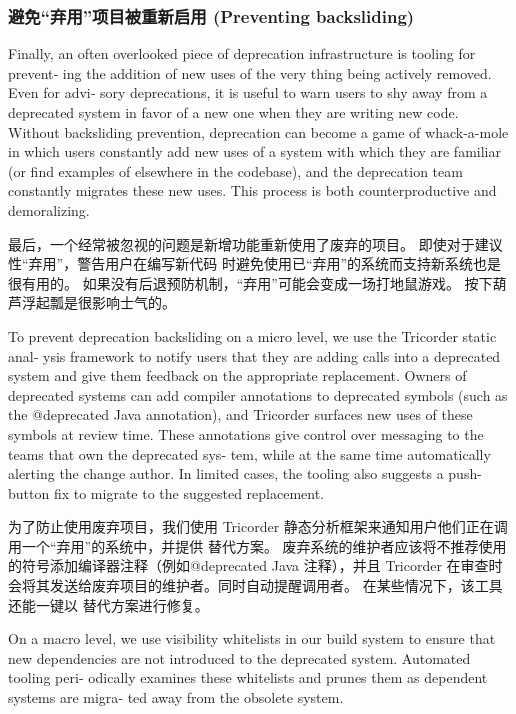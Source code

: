 \documentclass[10pt,a4paper,UTF8]{ctexart}
\begin{document}
\subsubsection{避免“弃用”项目被重新启用 (Preventing backsliding)}
\label{sec:orgc932d06}

Finally, an often overlooked piece of deprecation infrastructure is tooling for prevent‐ ing the
addition of new uses of the very thing being actively removed. Even for advi‐ sory deprecations, it
is useful to warn users to shy away from a deprecated system in favor of a new one when they are
writing new code. Without backsliding prevention, deprecation can become a game of whack-a-mole in
which users constantly add new uses of a system with which they are familiar (or find examples of
elsewhere in the codebase), and the deprecation team constantly migrates these new uses. This
process is both counterproductive and demoralizing.

最后，一个经常被忽视的问题是新增功能重新使用了废弃的项目。 即使对于建议性“弃用”，警告用户在编写新代码
时避免使用已“弃用”的系统而支持新系统也是很有用的。 如果没有后退预防机制，“弃用”可能会变成一场打地鼠游戏。
按下葫芦浮起瓢是很影响士气的。

To prevent deprecation backsliding on a micro level, we use the Tricorder static anal‐ ysis
framework to notify users that they are adding calls into a deprecated system and give them feedback
on the appropriate replacement. Owners of deprecated systems can add compiler annotations to
deprecated symbols (such as the @deprecated Java annotation), and Tricorder surfaces new uses of
these symbols at review time. These annotations give control over messaging to the teams that own
the deprecated sys‐ tem, while at the same time automatically alerting the change author. In limited
cases, the tooling also suggests a push-button fix to migrate to the suggested replacement.

为了防止使用废弃项目，我们使用 Tricorder 静态分析框架来通知用户他们正在调用一个“弃用”的系统中，并提供
替代方案。 废弃系统的维护者应该将不推荐使用的符号添加编译器注释（例如@deprecated Java 注释），并且
Tricorder 在审查时会将其发送给废弃项目的维护者。同时自动提醒调用者。 在某些情况下，该工具还能一键以
替代方案进行修复。

On a macro level, we use visibility whitelists in our build system to ensure that new dependencies
are not introduced to the deprecated system. Automated tooling peri‐ odically examines these
whitelists and prunes them as dependent systems are migra‐ ted away from the obsolete system.
\end{document}
